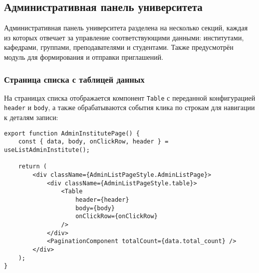\subsection{Административная панель университета}
Административная панель университета разделена на несколько секций, каждая из которых отвечает за управление соответствующими данными: институтами, кафедрами, группами, преподавателями и студентами. Также предусмотрён модуль для формирования и отправки приглашений.

\subsubsection{Страница списка с таблицей данных}
На страницах списка отображается компонент \texttt{Table} с переданной конфигурацией \texttt{header} и \texttt{body}, а также обрабатываются события клика по строкам для навигации к деталям записи:
\begin{lstlisting}[caption={Компонент страницы списка институтов}]
export function AdminInstitutePage() {
    const { data, body, onClickRow, header } = useListAdminInstitute();

    return (
        <div className={AdminListPageStyle.AdminListPage}>
            <div className={AdminListPageStyle.table}>
                <Table
                    header={header}
                    body={body}
                    onClickRow={onClickRow}
                />
            </div>
            <PaginationComponent totalCount={data.total_count} />
        </div>
    );
}
\end{lstlisting}

